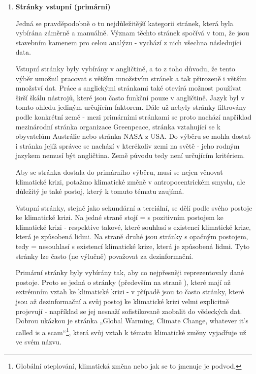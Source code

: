     \begin{enumerate}
      \item \textbf{Stránky vstupní (primární)}
    
        Jedná se pravděpodobně o tu nejdůležitější kategorii stránek, která byla vybírána záměrně a manuálně. Význam těchto stránek spočívá v tom, že jsou stavebním kamenem pro celou analýzu - vychází z nich všechna následují\-cí data.
        
        Vstupní stránky byly vybírány v angličtině, a to z toho důvodu, že tento výběr umožnil pracovat s větším množstvím stránek a tak přirozeně i větším množství dat. Práce s anglickými stránkami také otevírá možnost používat širší škálu nástrojů, které jsou často funkční pouze v angličtině. Jazyk byl v tomto ohledu jediným určujícím faktorem. Dále už nebyly stránky filtrovány podle konkrétní země - mezi primárními stránkami se proto nachází například mezinárodní stránka organizace Greenpeace, stránka vztahující se k obyvatelům Austrálie nebo stránka NASA z USA. Do výběru se mohla dostat i stránka jejíž správce se nachází v kterékoliv zemi na světě - jeho rodným jazykem nemusí být angličtina. Země původu tedy není určujícím kritériem.
        
        Aby se stránka dostala do primárního výběru, musí se nejen věnovat klimatické krizi, potažmo klimatické změně v antropocentrickém smyslu, ale důležitý je také postoj, který k tomuto tématu zaujímá. 
        
        Vstupní stránky, stejně jako sekundární a terciální, se dělí podle svého postoje ke klimatické krizi. Na jedné straně stojí \textbf{} = s pozitivním postojem ke klimatické krizi - respektive takové, které souhlasí s existencí klimatické krize, která je způsobená lidmi. Na straně druhé jsou stránky s opačným postojem, tedy \textbf{} = nesouhlasí s existencí klimatické krize, která je způsobená lidmi. Tyto stránky lze často (ne výlučně) považovat za dezinformační.
        
        Primární stránky byly vybírány tak, aby co nejpřesněji reprezentovaly dané postoje. Proto se jedná o stránky (především na straně ), které mají až extrémním vztah ke klimatické krizi - v případě  jsou to často stránky, které jsou až dezinformační a svůj postoj ke klimatické krizi velmi explicitně projevují - například se jej nesnaží sofistikovaně zaobalit do vědeckých dat. Dobrou ukázkou je stránka „Global Warming, Climate Change, whatever it's called is a scam“\footnote{Globální oteplování, klimatická změna nebo jak se to jmenuje je podvod.}, která svůj vztah k tématu klimatické změny vyjadřuje už ve svém názvu. 
        

\end{enumerate}
